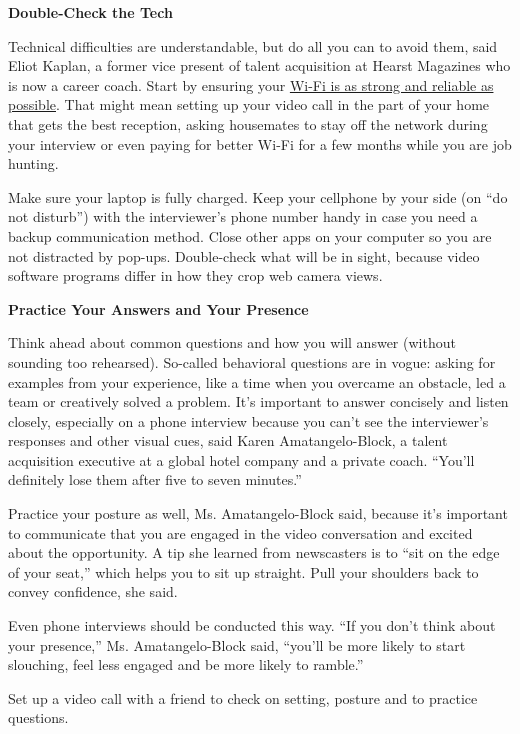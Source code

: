 \textbf{Double-Check the Tech}

Technical difficulties are understandable, but do all you can to avoid
them, said Eliot Kaplan, a former vice present of talent acquisition at
Hearst Magazines who is now a career coach. Start by ensuring your
\href{https://www.nytimes.com/wirecutter/blog/make-wi-fi-suck-less-working-from-home/}{Wi-Fi
is as strong and reliable as possible}. That might mean setting up your
video call in the part of your home that gets the best reception, asking
housemates to stay off the network during your interview or even paying
for better Wi-Fi for a few months while you are job hunting.

Make sure your laptop is fully charged. Keep your cellphone by your side
(on ``do not disturb'') with the interviewer's phone number handy in
case you need a backup communication method. Close other apps on your
computer so you are not distracted by pop-ups. Double-check what will be
in sight, because video software programs differ in how they crop web
camera views.

\textbf{Practice Your Answers and Your Presence}

Think ahead about common questions and how you will answer (without
sounding too rehearsed). So-called behavioral questions are in vogue:
asking for examples from your experience, like a time when you overcame
an obstacle, led a team or creatively solved a problem. It's important
to answer concisely and listen closely, especially on a phone interview
because you can't see the interviewer's responses and other visual cues,
said Karen Amatangelo-Block, a talent acquisition executive at a global
hotel company and a private coach. ``You'll definitely lose them after
five to seven minutes.''

Practice your posture as well, Ms. Amatangelo-Block said, because it's
important to communicate that you are engaged in the video conversation
and excited about the opportunity. A tip she learned from newscasters is
to ``sit on the edge of your seat,'' which helps you to sit up straight.
Pull your shoulders back to convey confidence, she said.

Even phone interviews should be conducted this way. ``If you don't think
about your presence,'' Ms. Amatangelo-Block said, ``you'll be more
likely to start slouching, feel less engaged and be more likely to
ramble.''

Set up a video call with a friend to check on setting, posture and to
practice questions.

